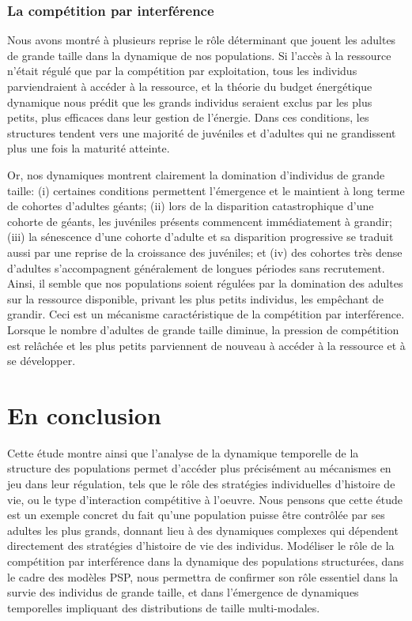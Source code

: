 \subsubsection{La compétition par interférence}

Nous avons montré à plusieurs reprise le rôle déterminant que jouent les adultes
de grande taille dans la dynamique de nos populations. Si l'accès à la ressource
n'était régulé que par la compétition par exploitation, tous les individus
parviendraient à accéder à la ressource, et la théorie du budget énergétique
dynamique nous prédit que les grands individus seraient exclus par les plus
petits, plus efficaces dans leur gestion de l'énergie. Dans ces conditions, les
structures tendent vers une majorité de juvéniles et d'adultes qui ne
grandissent plus une fois la maturité atteinte. 

Or, nos dynamiques montrent clairement la domination d'individus de grande
taille: (i) certaines conditions permettent l'émergence et le maintient à long
terme de cohortes d'adultes géants; (ii) lors de la disparition catastrophique
d'une cohorte de géants, les juvéniles présents commencent immédiatement à
grandir; (iii) la sénescence d'une cohorte d'adulte et sa disparition
progressive se traduit aussi par une reprise de la croissance des juvéniles; et
(iv) des cohortes très dense d'adultes s'accompagnent généralement de longues
périodes sans recrutement. Ainsi, il semble que nos populations soient régulées
par la domination des adultes sur la ressource disponible, privant les plus
petits individus, les empêchant de grandir. Ceci est un mécanisme
caractéristique de la compétition par interférence. Lorsque le nombre d'adultes
de grande taille diminue, la pression de compétition est relâchée et les plus
petits parviennent de nouveau à accéder à la ressource et à se développer. 


\section{En conclusion}

Cette étude montre ainsi que l'analyse de la dynamique temporelle de la
structure des populations permet d'accéder plus précisément au mécanismes en
jeu dans leur régulation, tels que le rôle des stratégies individuelles
d'histoire de vie, ou le type d'interaction compétitive à l'oeuvre. Nous pensons
que cette étude est un exemple concret du fait qu'une population puisse être
contrôlée par ses adultes les plus grands, donnant lieu à des dynamiques
complexes qui dépendent directement des stratégies d'histoire de vie des
individus. Modéliser le rôle de la compétition par interférence dans la
dynamique des populations structurées, dans le cadre des modèles PSP, nous
permettra de confirmer son rôle essentiel dans la survie des
individus de grande taille, et dans l'émergence de dynamiques temporelles
impliquant des distributions de taille multi-modales. 


